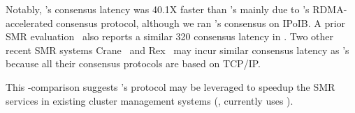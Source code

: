 Notably, \xxx's consensus latency was 40.1X faster than \zookeeper's mainly due 
to \xxx's RDMA-accelerated consensus protocol, although we ran \calvin's 
\zookeeper consensus on IPoIB. A prior SMR evaluation~\cite{dare:hpdc15} also 
reports a similar 320 \us consensus latency in \zookeeper. Two other recent SMR 
systems Crane~\cite{crane:sosp15} and Rex~\cite{rex:eurosys14} may incur 
similar consensus latency as \zookeeper's because all their consensus protocols 
are based on TCP/IP.

This \xxx-\calvin comparison suggests \xxx's \paxos protocol may be leveraged 
to speedup the SMR services in existing cluster management systems (\eg, \mesos 
currently uses \zookeeper).







% 

